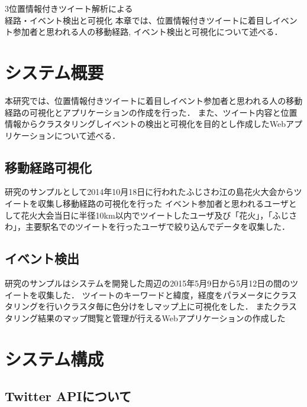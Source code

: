 \chapterhead
{3}{位置情報付きツイート解析による\\
経路・イベント検出と可視化}
{本章では、位置情報付きツイートに着目しイベント参加者と思われる人の移動経路, イベント検出と可視化について述べる．}


\section{システム概要}
本研究では、位置情報付きツイートに着目しイベント参加者と思われる人の移動経路の可視化とアプリケーションの作成を行った．
また、ツイート内容と位置情報からクラスタリングしイベントの検出と可視化を目的とし作成したWebアプリケーションについて述べる．

\subsection{移動経路可視化}
研究のサンプルとして2014年10月18日に行われたふじさわ江の島花火大会\cite{webpage_fujisawa}からツイートを収集し移動経路の可視化を行った
イベント参加者と思われるユーザとして花火大会当日に半径10km以内でツイートしたユーザ及び「花火」，「ふじさわ」，主要駅名でのツイートを行ったユーザで絞り込んでデータを収集した．


\subsection{イベント検出}
研究のサンプルはシステムを開発した周辺の2015年5月9日から5月12日の間のツイートを収集した．
ツイートのキーワードと緯度，経度をパラメータにクラスタリングを行いクラスタ毎に色分けをしマップ上に可視化をした．
またクラスタリング結果のマップ閲覧と管理が行えるWebアプリケーションの作成した



\newpage

\section{システム構成}
\subsection{Twitter APIについて}
